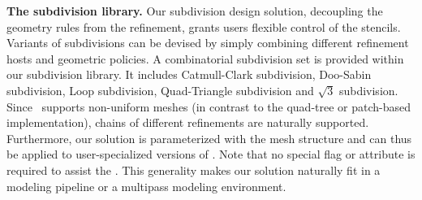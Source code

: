 \noindent\textbf{The subdivision library.}
Our subdivision design solution, decoupling the geometry rules from
the refinement, grants users flexible control of the stencils.
Variants of subdivisions can be devised by simply combining different
refinement hosts and geometric policies.  A combinatorial subdivision
set is provided within our subdivision library. It includes
Catmull-Clark subdivision, Doo-Sabin subdivision, Loop subdivision,
Quad-Triangle subdivision and $\sqrt{3}$ subdivision. Since \cgalpoly\ 
supports non-uniform meshes (in contrast to the quad-tree or
patch-based implementation), chains of different refinements are
naturally supported.
Furthermore, our solution is parameterized with the mesh structure and
can thus be applied to user-specialized versions of \cgalpoly.  Note
that no special flag or attribute is required to assist the \tr . This
generality makes our solution naturally fit in a modeling pipeline or a
multipass modeling environment.


 
